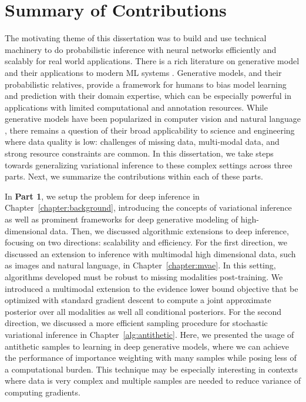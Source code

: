 \section{Summary of Contributions}

The motivating theme of this dissertation was to build and use technical machinery to do probabilistic inference with neural networks efficiently and scalably for real world applications. There is a rich literature on generative model and their applications to modern ML systems \cite{murphy2022probabilistic,goodman2018probabilistic}. Generative models, and their probabilistic relatives, provide a framework for humans to bias model learning and prediction with their domain expertise,  which can be especially powerful in applications with limited computational and annotation resources. While generative models have been popularized in computer vision and natural language \cite{radford2021learning,ramesh2021zero,brown2020language}, there remains a question of their broad applicability to science and engineering where data quality is low: challenges of missing data, multi-modal data, and strong resource constraints are common. In this dissertation, we take steps towards generalizing variational inference to these complex settings across three parts. Next, we summarize the contributions within each of these parts.

In \textbf{Part 1}, we setup the problem for deep inference in Chapter~\ref{chapter:background}, introducing the concepts of variational inference as well as prominent frameworks for deep generative modeling of high-dimensional data. Then, we discussed algorithmic extensions to deep inference, focusing on two directions: scalability and efficiency. For the first direction, we discussed an extension to inference with multimodal high dimensional data, such as images and natural language, in Chapter~\ref{chapter:mvae}. In this setting, algorithms developed must be robust to missing modalities post-training. We introduced a multimodal extension to the evidence lower bound objective that be optimized with standard gradient descent to compute a joint approximate posterior over all modalities as well all conditional posteriors. For the second direction, we discussed a more efficient sampling procedure for stochastic variational inference in Chapter~\ref{alg:antithetic}. Here, we presented the usage of antithetic samples to learning in deep generative models, where we can achieve the performance of importance weighting with many samples while posing less of a computational burden. This technique may be especially interesting in contexts where data is very complex and multiple samples are needed to reduce variance of computing gradients.

